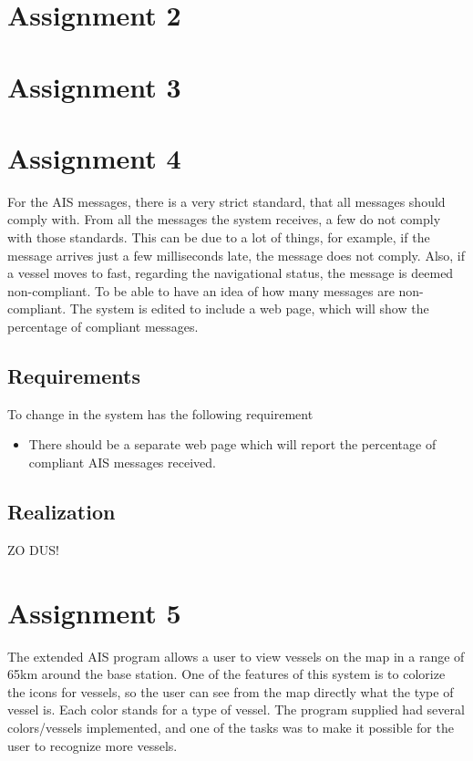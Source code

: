 \documentclass[12pt]{article}
\begin{document}
\section*{Assignment 2}

\section*{Assignment 3}

\section*{Assignment 4}
For the AIS messages, there is a very strict standard, that all  messages should comply with. From all the messages the system receives, a few do not comply with those standards. This can be due to a lot of things, for example, if the message arrives just a few milliseconds late, the message does not comply. Also, if a vessel moves to fast, regarding the navigational status, the message is deemed non-compliant. To be able to have an idea of how many messages are non-compliant. The system is edited to include a web page, which will show the percentage of compliant messages.

\subsection*{Requirements}
To change in the system has the following requirement
\begin{itemize}
\item There should be a separate web page which will report the percentage of compliant AIS messages received.
\end{itemize}

\subsection*{Realization}
ZO DUS!

\section*{Assignment 5}
The extended AIS program allows a user to view vessels on the map in a range of 65km around the base station. One of the features of this system is to colorize the icons for vessels, so the user can see from the map directly what the type of vessel is. Each color stands for a type of vessel. The program supplied had several colors/vessels implemented, and one of the tasks was to make it possible for the user to recognize more vessels.
\end{document}
